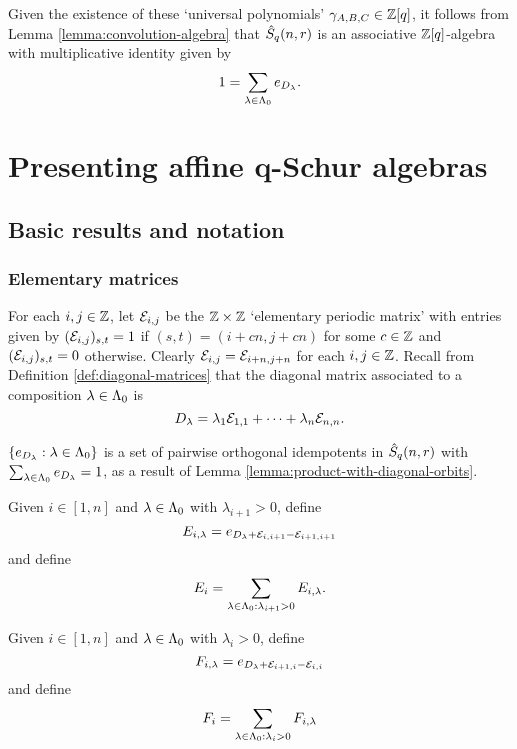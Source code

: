 \documentclass[a4paper, 11pt]{report}
\begin{document}
Given the existence of these `universal polynomials' $\gamma_{A,B,C}\in\mathbb{Z}[q]$, it follows from Lemma \ref{lemma:convolution-algebra} that $\hat{S}_q(n,r)$ is an associative $\mathbb{Z}[q]$-algebra with multiplicative identity given by
\begin{equation*}
1 = \sum_{\lambda\in{\Lambda_0}} e_{D_\lambda}.
\end{equation*}


\chapter{Presenting affine q-Schur algebras}

\section{Basic results and notation}

\subsection{Elementary matrices}

For each $i,j\in\mathbb{Z}$, let $\mathcal{E}_{i,j}$ be the $\mathbb{Z}\times\mathbb{Z}$ `elementary periodic matrix' with entries given by $(\mathcal{E}_{i,j})_{s,t}=1$ if $(s,t) = (i+cn,j+cn)$ for some $c\in\mathbb{Z}$ and $(\mathcal{E}_{i,j})_{s,t}=0$ otherwise. Clearly $\mathcal{E}_{i,j} = \mathcal{E}_{i+n,j+n}$ for each $i,j\in\mathbb{Z}$. Recall from Definition \ref{def:diagonal-matrices} that the diagonal matrix associated to a composition $\lambda\in{\Lambda_0}$ is
\begin{equation*}
D_\lambda = \lambda_1\mathcal{E}_{1,1} +\cdots + \lambda_n\mathcal{E}_{n,n}.
\end{equation*}

$\{e_{D_\lambda}:\lambda\in{\Lambda_0}\}$ is a set of pairwise orthogonal idempotents in $\hat{S}_q(n,r)$ with $\sum_{\lambda\in{\Lambda_0}}e_{D_\lambda} = 1$, as a result of Lemma \ref{lemma:product-with-diagonal-orbits}.

Given $i\in[1,n]$ and $\lambda\in{\Lambda_0}$ with $\lambda_{i+1}>0$, define
\begin{equation*}
E_{i,\lambda} = e_{D_\lambda + \mathcal{E}_{i,i+1} - \mathcal{E}_{i+1,i+1}}
\end{equation*}
and define
\begin{equation*}
E_i = \sum_{\lambda\in{\Lambda_0}:\lambda_{i+1}>0} E_{i,\lambda}.
\end{equation*}

Given $i\in[1,n]$ and $\lambda\in{\Lambda_0}$ with $\lambda_i>0$, define
\begin{equation*}
F_{i,\lambda} = e_{D_\lambda + \mathcal{E}_{i+1,i} - \mathcal{E}_{i,i}}
\end{equation*}
and define
\begin{equation*}
F_i = \sum_{\lambda\in{\Lambda_0}:\lambda_i>0} F_{i,\lambda}
\end{equation*}
\end{document}
